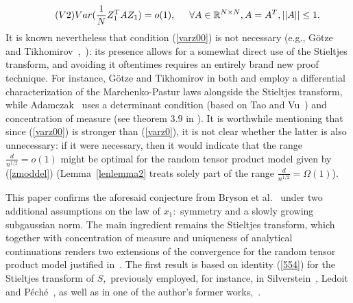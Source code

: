 \documentclass{article}
\numberwithin{equation}{section}
\begin{document}
\begin{equation}\tag{\(V2\)}\label{varz00}
    Var(\frac{1}{N}Z_1^TAZ_1)=o(1), \hspace{0.5cm} \forall A \in \mathbb{R}^{N \times N}, A=A^T, ||A|| \leq 1.
\end{equation}
It is known nevertheless that condition (\ref{varz00}) is not necessary (e.g., Götze and Tikhomirov~\cite{gotze1},~\cite{gotze2}): its presence allows for a somewhat direct use of the Stieltjes transform, and avoiding it oftentimes requires an entirely brand new proof technique. %
For instance, Götze and Tikhomirov in both \cite{gotze1} and \cite{gotze2} employ a differential characterization of the Marchenko-Pastur laws alongside the Stieltjes transform, while Adamczak~\cite{adamczac} uses a determinant condition (based on Tao and Vu~\cite{taovu}) and concentration of measure (see theorem \(3.9\) in \cite{adamczac}). It is worthwhile mentioning that since (\ref{varz00}) is stronger than (\ref{varz0}), it is not clear whether the latter is also unnecessary: if it were necessary, then it would indicate that the range \(\frac{d}{n^{1/2}}=o(1)\) might be optimal for the random tensor product model given by (\ref{zmoddel}) (Lemma~\ref{lenlemma2} treats solely part of the range \(\frac{d}{n^{1/2}}=\Omega(1)\)). 
\par
This paper confirms the aforesaid conjecture from Bryson et al.~\cite{bryson} under two additional assumptions on the law of \(x_1:\) symmetry and a slowly growing subgaussian norm. The main ingredient remains the Stieltjes transform, which together with concentration of measure and uniqueness of analytical continuations renders two extensions of the convergence for the random tensor product model justified in~\cite{bryson}. The first result is based on %
identity (\ref{554}) for the Stieltjes transform of \(S,\) previously employed, for instance, in Silverstein~\cite{silv1}, Ledoit and Péché~\cite{ledoitpeche}, as well as in one of the author's former works,~\cite{oldpaper}. %

\end{document}
